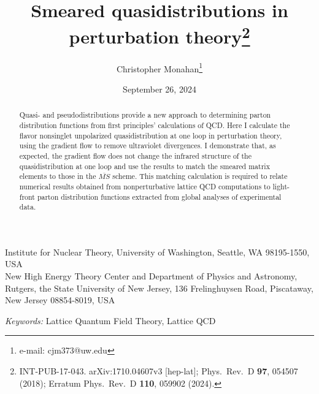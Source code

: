 \documentclass[11pt]{article}
\newcommand{\ms}{\overline{MS}}
\begin{document}
\title{Smeared quasidistributions in perturbation theory\thanks{INT-PUB-17-043.
arXiv:1710.04607v3 [hep-lat]; Phys.\ Rev.\ D \textbf{97}, 054507 (2018);
Erratum Phys.\ Rev.\ D \textbf{110}, 059902 (2024).}}
\author{Christopher Monahan\thanks{e-mail: cjm373@uw.edu}}
\date{September 26, 2024}
\maketitle

\noindent Institute for Nuclear Theory, University of Washington,
Seattle, WA 98195-1550, USA\\
New High Energy Theory Center and Department of Physics and Astronomy,
Rutgers, the State University of New Jersey,
136 Frelinghuysen Road, Piscataway, New Jersey 08854-8019, USA

\begin{abstract}
Quasi- and pseudodistributions provide a new approach to determining parton distribution functions from first principles' calculations of QCD. Here I calculate the flavor nonsinglet unpolarized quasidistribution at one loop in perturbation theory, using the gradient flow to remove ultraviolet divergences. I demonstrate that, as expected, the gradient flow does not change the infrared structure of the quasidistribution at one loop and use the results to match the smeared matrix elements to those in the $\ms$ scheme. This matching calculation is required to relate numerical results obtained from nonperturbative lattice QCD computations to light-front parton distribution functions extracted from global analyses of experimental data.
\end{abstract}

\noindent\textit{Keywords:} Lattice Quantum Field Theory, Lattice QCD







\end{document}

